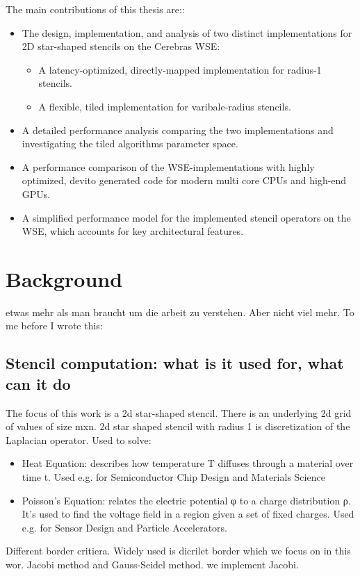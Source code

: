 \documentclass{article}
\begin{document}
The main contributions of this thesis are::
\begin{itemize}
    \item The design, implementation, and analysis of two distinct implementations for 2D star-shaped stencils on the Cerebras WSE:
    \begin{itemize}
        \item A latency-optimized, directly-mapped implementation for radius-1 stencils.
        \item A flexible, tiled implementation for varibale-radius stencils.
    \end{itemize}
    \item A detailed performance analysis comparing the two implementations and investigating the tiled algorithms parameter space. 
    \item A performance comparison of the WSE-implementations with highly optimized, devito generated code for modern multi core CPUs and high-end GPUs.
    \item A simplified performance model for the implemented stencil operators on the WSE, which accounts for key architectural features.
\end{itemize}


\section{Background}
etwas mehr als man braucht um die arbeit zu verstehen. Aber nicht viel mehr.
To me before I wrote this:
\subsection{Stencil computation: what is it used for, what can it do}
The focus of this work is a 2d star-shaped stencil. There is an underlying 2d grid of values of size mxn.  
2d star shaped stencil with radius 1 is discretization of the Laplacian operator.
Used to solve:
\begin{itemize}
    \item Heat Equation: describes how temperature T diffuses through a material over time t. Used e.g. for Semiconductor Chip Design and Materials Science
    \item Poisson's Equation: relates the electric potential φ to a charge distribution ρ. It's used to find the voltage field in a region given a set of fixed charges. Used e.g. for Sensor Design and Particle Accelerators.
\end{itemize}
Different border critiera. Widely used is dicrilet border which we focus on in this wor.
Jacobi method and Gauss-Seidel method. we implement Jacobi.
\end{document}
